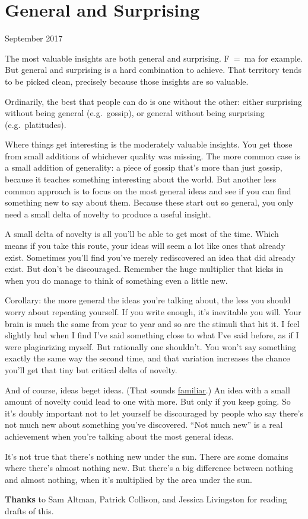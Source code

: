 \chapter{General and Surprising}

September 2017

The most valuable insights are both general and surprising. F~=~ma for
example. But general and surprising is a hard combination to achieve.
That territory tends to be picked clean, precisely because those
insights are so valuable.

Ordinarily, the best that people can do is one without the other: either
surprising without being general (e.g.~gossip), or general without being
surprising (e.g.~platitudes).

Where things get interesting is the moderately valuable insights. You
get those from small additions of whichever quality was missing. The
more common case is a small addition of generality: a piece of gossip
that's more than just gossip, because it teaches something interesting
about the world. But another less common approach is to focus on the
most general ideas and see if you can find something new to say about
them. Because these start out so general, you only need a small delta of
novelty to produce a useful insight.

A small delta of novelty is all you'll be able to get most of the time.
Which means if you take this route, your ideas will seem a lot like ones
that already exist. Sometimes you'll find you've merely rediscovered an
idea that did already exist. But don't be discouraged. Remember the huge
multiplier that kicks in when you do manage to think of something even a
little new.

Corollary: the more general the ideas you're talking about, the less you
should worry about repeating yourself. If you write enough, it's
inevitable you will. Your brain is much the same from year to year and
so are the stimuli that hit it. I feel slightly bad when I find I've
said something close to what I've said before, as if I were plagiarizing
myself. But rationally one shouldn't. You won't say something exactly
the same way the second time, and that variation increases the chance
you'll get that tiny but critical delta of novelty.

And of course, ideas beget ideas. (That sounds
\href{ecw.html}{familiar}.) An idea with a small amount of novelty could
lead to one with more. But only if you keep going. So it's doubly
important not to let yourself be discouraged by people who say there's
not much new about something you've discovered. ``Not much new'' is a
real achievement when you're talking about the most general ideas.

It's not true that there's nothing new under the sun. There are some
domains where there's almost nothing new. But there's a big difference
between nothing and almost nothing, when it's multiplied by the area
under the sun.

\textbf{Thanks} to Sam Altman, Patrick Collison, and Jessica Livingston
for reading drafts of this.